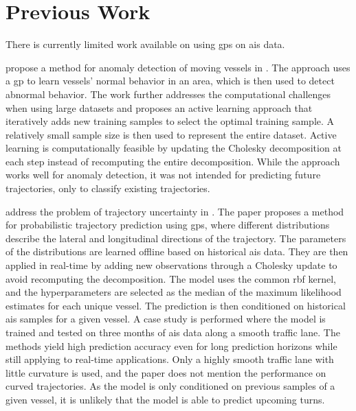 \chapter{Previous Work}\label{chap:prior_work}

There is currently limited work available on using \acrshort{gp}s on \acrshort{ais} data.

\citeauthor{gpanomaly} propose a method for anomaly detection of moving vessels in \cite{gpanomaly}. The approach uses a \acrshort{gp} to learn vessels' normal behavior in an area, which is then used to detect abnormal behavior. The work further addresses the computational challenges when using large datasets and proposes an active learning approach that iteratively adds new training samples to select the optimal training sample. A relatively small sample size is then used to represent the entire dataset. Active learning is computationally feasible by updating the Cholesky decomposition at each step instead of recomputing the entire decomposition. While the approach works well for anomaly detection, it was not intended for predicting future trajectories, only to classify existing trajectories.

\citeauthor{gp_ais_trajectory} address the problem of trajectory uncertainty in \cite{gp_ais_trajectory}. The paper proposes a method for probabilistic trajectory prediction using \acrshort{gp}s, where different distributions describe the lateral and longitudinal directions of the trajectory. The parameters of the distributions are learned offline based on historical \acrshort{ais} data. They are then applied in real-time by adding new observations through a Cholesky update to avoid recomputing the decomposition. The model uses the common \acrshort{rbf} kernel, and the hyperparameters are selected as the median of the maximum likelihood estimates for each unique vessel. The prediction is then conditioned on historical \acrshort{ais} samples for a given vessel.
A case study is performed where the model is trained and tested on three months of \acrshort{ais} data along a smooth traffic lane. The methods yield high prediction accuracy even for long prediction horizons while still applying to real-time applications. Only a highly smooth traffic lane with little curvature is used, and the paper does not mention the performance on curved trajectories. As the model is only conditioned on previous samples of a given vessel, it is unlikely that the model is able to predict upcoming turns. 

